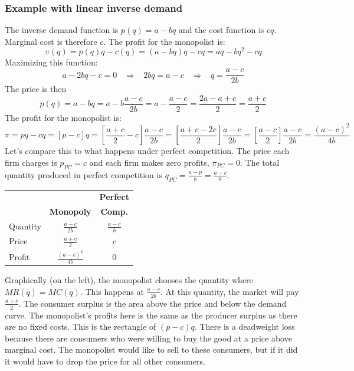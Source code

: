 \documentclass{article}
\begin{document}
\subsubsection*{Example with linear inverse demand}
The inverse demand function is $p\left( q \right)=a-bq$ and the cost function is $cq$. Marginal cost is therefore $c$. The profit for the monopolist is:
\[
  \pi\left( q \right)=p\left(q \right)q - c\left( q \right) = \left( a-bq \right)q-cq=aq - bq^2 - cq
\]
Maximizing this function:
\[
  a-2bq-c=0 \;\;\;\Longrightarrow\;\;\;
  2bq=a-c \;\;\;\Longrightarrow\;\;\;
  q=\frac{a-c}{2b}
\]
The price is then \[p\left( q \right)=a-bq=a-b\frac{a-c}{2b}=a-\frac{a-c}{2}=\frac{2a-a+c}{2}=\frac{a+c}{2}\] The profit for the monopolist is:
\[
  \pi=pq-cq=\left[ p-c \right]q=\left[ \frac{a+c}{2}-c \right]\frac{a-c}{2b}=\left[ \frac{a+c-2c}{2} \right]\frac{a-c}{2b}=\left[ \frac{a-c}{2} \right]\frac{a-c}{2b}=\frac{\left( a-c \right)^2}{4b}
\]
Let's compare this to what happens under perfect competition. The price each firm charges is $p_{PC}=c$ and each firm makes zero profits, $\pi_{PC}=0$. The total quantity produced in perfect competition is $q_{PC}=\frac{a-p}{b}=\frac{a-c}{b}$.
\begin{center}
  \begin{tabular}{|l|c|c|} \hline
             &                                 & \textbf{Perfect}\\
             & \textbf{Monopoly}               & \textbf{Comp.}  \\\hline
    Quantity & $\frac{a-c}{2b}$                & $\frac{a-c}{b}$ \\\hline
    Price    & $\frac{a+c}{2}$                 & $c$             \\\hline
    Profit   & $\frac{\left(a-c\right)^2}{4b}$ & $0$             \\\hline
  \end{tabular}
\end{center}
Graphically (on the left), the monopolist chooses the quantity where $MR\left( q \right)=MC\left( q \right)$. This happens at $\frac{a-c}{2b}$. At this quantity, the market will pay $\frac{a+c}{2}$. The consumer surplus is the area above the price and below the demand curve. The monopolist's profits here is the same as the producer surplus as there are no fixed costs. This is the rectangle of $\left( p-c \right)q$. There is a deadweight loss because there are consumers who were willing to buy the good at a price above marginal cost. The monopolist would like to sell to these consumers, but if it did it would have to drop the price for all other consumers.
\end{document}
